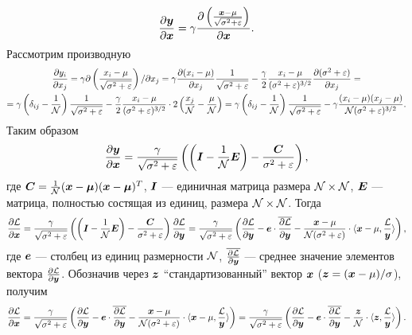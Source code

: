 \documentclass{report}
\numberwithin{theorem}{chapter}
\numberwithin{statement}{chapter}
\numberwithin{lemma}{chapter}
\theoremstyle{definition}
\numberwithin{task}{chapter}
\theoremstyle{remark}
\numberwithin{example}{chapter}
\theoremstyle{definition}
\numberwithin{definition}{chapter}
\theoremstyle{remark}
\theoremstyle{remark}
\numberwithin{lyrics}{section}
\begin{document}
\begin{gather*}
\frac{\partial \boldsymbol{y} }{\partial \boldsymbol{x}} = \gamma \frac{\partial \left(\frac{\boldsymbol{x} - \mu}{\sqrt{\sigma^2 + \varepsilon}}\right) }{\partial \boldsymbol{x}}.
\end{gather*}
Рассмотрим производную 
\begin{gather*}
\frac{\partial y_i }{\partial x_j} = \gamma \partial\left(\frac{x_i - \mu}{\sqrt{\sigma^2 + \varepsilon}}\right)/\partial x_j = 
\gamma \frac{\partial (x_i - \mu) }{\partial x_j} \frac{1}{\sqrt{\sigma^2 + \varepsilon}} - \frac{\gamma}{2} \frac{x_i - \mu}{(\sigma^2 + \varepsilon)^{3/2}} \frac{\partial (\sigma^2 + \varepsilon) }{\partial x_j} = \\
= \gamma \left(\delta_{ij} - \frac{1}{\mathcal{N}}\right) \frac{1}{\sqrt{\sigma^2 + \varepsilon}} - \frac{\gamma}{2} \frac{x_i - \mu}{(\sigma^2 + \varepsilon)^{3/2}} \cdot 2 \left(\frac{x_j}{\mathcal{N}} -  \frac{\mu}{\mathcal{N}} \right) =  \gamma \left(\delta_{ij} - \frac{1}{\mathcal{N}}\right) \frac{1}{\sqrt{\sigma^2 + \varepsilon}} - \gamma \frac{(x_i - \mu)(x_j - \mu)}{\mathcal{N}(\sigma^2 + \varepsilon)^{3/2}}.
\end{gather*}
Таким образом
\begin{gather*}
\frac{\partial \boldsymbol{y} }{\partial \boldsymbol{x}} = \frac{\gamma}{\sqrt{\sigma^2 + \varepsilon}} \left(\left(\boldsymbol{I} - \frac{1}{\mathcal{N}}\boldsymbol{E}\right) -  \frac{\boldsymbol{C}}{\sigma^2 + \varepsilon}\right),
\end{gather*}
где $\boldsymbol{C} = \frac{1}{\mathcal{N}}(\boldsymbol{x} - \boldsymbol{\mu})(\boldsymbol{x} - \boldsymbol{\mu})^T$, $\boldsymbol{I}$ --- единичная матрица размера $\mathcal{N} \times \mathcal{N}$, $\boldsymbol{E}$ --- матрица, полностью состящая из единиц, размера $\mathcal{N} \times \mathcal{N}$. Тогда
\begin{gather*}
\frac{\partial \mathcal{L} }{\partial \boldsymbol{x}} = \frac{\gamma}{\sqrt{\sigma^2 + \varepsilon}} \left(  \left(\boldsymbol{I} - \frac{1}{\mathcal{N}}\boldsymbol{E}\right) -  \frac{\boldsymbol{C}}{\sigma^2 + \varepsilon}\right) \frac{\partial \mathcal{L} }{\partial \boldsymbol{y}} = 
\frac{\gamma}{\sqrt{\sigma^2 + \varepsilon}} \left(\frac{\partial \mathcal{L} }{\partial \boldsymbol{y}} - \boldsymbol{e} \cdot \overline{\frac{\partial \mathcal{L} }{\partial \boldsymbol{y}}} - \frac{\boldsymbol{x} - \mu}{\mathcal{N}(\sigma^2 + \varepsilon)} \cdot \langle \boldsymbol{x} - \mu, \frac{\mathcal{L}}{\boldsymbol{y}}\rangle \right),
\end{gather*}
где $\boldsymbol{e}$ --- столбец из единиц размерности $\mathcal{N}$, $\overline{\frac{\partial \mathcal{L} }{\partial \boldsymbol{y}}}$ --- среднее значение элементов вектора $\frac{\partial \mathcal{L} }{\partial \boldsymbol{y}}$. Обозначив через $\boldsymbol{z}$ ``стандартизованный'' вектор $\boldsymbol{x}$ ($\boldsymbol{z} = (\boldsymbol{x} - \mu) / \sigma$), получим
\begin{gather*}
\frac{\partial \mathcal{L} }{\partial \boldsymbol{x}} =\frac{\gamma}{\sqrt{\sigma^2 + \varepsilon}} \left(\frac{\partial \mathcal{L} }{\partial \boldsymbol{y}} - \boldsymbol{e} \cdot \overline{\frac{\partial \mathcal{L} }{\partial \boldsymbol{y}}} - \frac{\boldsymbol{x} - \mu}{\mathcal{N}(\sigma^2 + \varepsilon)} \cdot \langle \boldsymbol{x} - \mu, \frac{\mathcal{L}}{\boldsymbol{y}}\rangle \right) = 
\frac{\gamma}{\sqrt{\sigma^2 + \varepsilon}} \left(\frac{\partial \mathcal{L} }{\partial \boldsymbol{y}} - \boldsymbol{e} \cdot \overline{\frac{\partial \mathcal{L} }{\partial \boldsymbol{y}}}  - \frac{\boldsymbol{z}}{\mathcal{N}} \cdot \langle \boldsymbol{z}, \frac{\mathcal{L}}{\boldsymbol{y}}\rangle \right).
\end{gather*}
\end{document}
